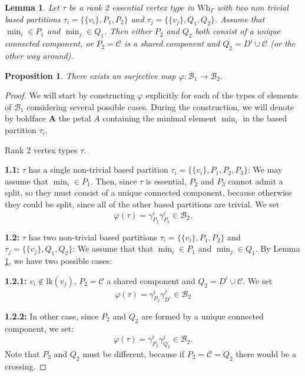 \documentclass[10pt,a4paper]{amsart}
\newtheorem{lem}{Lemma}
\newtheorem{prop}{Proposition}
\newcommand{\B}{\mathcal{B}}
\newcommand{\C}{\mathcal{C}}
\newcommand{\G}{\Gamma}
\newcommand{\Wh}{\mathrm{Wh}}
\newcommand{\lk}{\mathrm{lk}}
\begin{document}
\begin{lem}\label{lem:rank2Partitions}
    Let $\tau$ be a rank 2 essential vertex type in $\Wh_\G$ with two non trivial based partitions $\tau_i=\{\{v_i\}, P_1, P_2\}$ and $\tau_j=\{\{v_j\}, Q_1, Q_2\}$. Assume that $\min_i\in P_1$ and $\min_j\in Q_1$. Then either $P_2$ and $Q_2$ both consist of a unique connected component, or $P_2=\C$ is a shared component and $Q_2=D^i\cup\C$ (or the other way around).
\end{lem}

\begin{prop}
    There exists an surjective map   $\varphi: \B_1\rightarrow\B_2$. \label{prop:baseIsomor}
\end{prop}

\begin{proof}
We will start by  constructing $\varphi$ explicitly for each of the types of elements of $\B_1$ considering several possible cases. During the construction, we will denote by boldface  $\boldsymbol{A}$ the petal $A$ containing the minimal element $\min_i$ in the based partition $\tau_i$. 

     Rank 2 vertex types $\tau$.

     {\textbf{1.1:}} $\tau$ has a single non-trivial based partition $\tau_i=\{\{v_i\},P_1,P_2,P_3\}$:  We may assume that  $\min_i\in P_1$. Then, since $\tau$ is essential, $P_2$ and $P_3$ cannot admit a split, so they must consist of a unique connected component, because otherwise they could be split, since all of the other based partitions are trivial. We set 
        $$
        \varphi(\tau)= \gamma^i_{P_2}\gamma^i_{P_3}\in\B_2.
        $$

     
     {\textbf{1.2:}} $\tau$ has two non-trivial based partitions $\tau_i=\{\{v_i\},P_1,P_2\}$ and $\tau_j=\{\{v_j\},Q_1,Q_2\}$:
     We  assume that that $\min_i\in P_1$ and $\min_j\in Q_1$. By Lemma \ref{lem:rank2Partitions}, we have two possible cases:
        
         {\textbf{1.2.1:}}  $v_i\notin \lk(v_j)$, $P_2=\C$ a shared component and $Q_2=D^i\cup\C$. We set
         $$\varphi(\tau)= \gamma^i_{P_2}\gamma^j_{D^i}\in\B_2$$

         {\textbf{1.2.2:}} In other case, since $P_2$ and $Q_2$ are formed by a unique connected component, we set:
        $$\varphi(\tau)= \gamma^i_{P_2}\gamma^j_{Q_2}\in\B_2.$$
        Note that $P_2$ and $Q_2$ must be different, because if $P_2=\C=Q_2$ there would be a crossing.

         


\end{proof}
\end{document}
